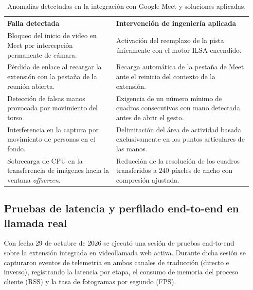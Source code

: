 \begin{table}[H]
    \centering
    \small
    \caption{Anomalías detectadas en la integración con Google Meet y soluciones aplicadas.}
    \label{tab:fallas_integracion}
    \begin{tabularx}{\textwidth}{@{}>{\raggedright\arraybackslash}p{} >{\raggedright\arraybackslash}X@{}}
        \toprule
        \textbf{Falla detectada} & \textbf{Intervención de ingeniería aplicada} \\
        \midrule
        Bloqueo del inicio de video en Meet por intercepción permanente de cámara. & Activación del reemplazo de la pista únicamente con el motor ILSA encendido. \\
        \addlinespace[2pt]
        Pérdida de enlace al recargar la extensión con la pestaña de la reunión abierta. & Recarga automática de la pestaña de Meet ante el reinicio del contexto de la extensión. \\
        \addlinespace[2pt]
        Detección de falsas manos provocada por movimiento del torso. & Exigencia de un número mínimo de cuadros consecutivos con mano detectada antes de abrir el gesto. \\
        \addlinespace[2pt]
        Interferencia en la captura por movimiento de personas en el fondo. & Delimitación del área de actividad basada exclusivamente en los puntos articulares de las manos. \\
        \addlinespace[2pt]
        Sobrecarga de CPU en la transferencia de imágenes hacia la ventana \textit{offscreen}. & Reducción de la resolución de los cuadros transferidos a $240$ píxeles de ancho con compresión ajustada. \\
        \bottomrule
    \end{tabularx}
\end{table}

\subsection{Pruebas de latencia y perfilado end-to-end en llamada real}
\label{sec:eval_telemetria_vivo}

Con fecha 29 de octubre de 2026 se ejecutó una sesión de pruebas end-to-end sobre la extensión integrada en videollamada web activa. Durante dicha sesión se capturaron eventos de telemetría en ambos canales de traducción (directo e inverso), registrando la latencia por etapa, el consumo de memoria del proceso cliente (RSS) y la tasa de fotogramas por segundo (FPS).

